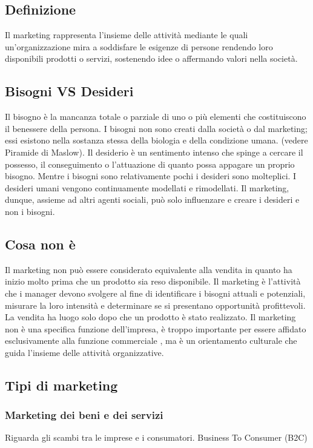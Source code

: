\subsection{Definizione}
Il marketing rappresenta l’insieme delle attività mediante le quali un’organizzazione mira a soddisfare le esigenze di persone rendendo loro disponibili prodotti o servizi, sostenendo idee o affermando valori nella società.

\subsection{Bisogni VS Desideri}
Il bisogno è la mancanza totale o parziale di uno o più elementi che costituiscono il benessere della persona. I bisogni non sono creati dalla società o dal marketing; essi esistono nella sostanza stessa della biologia e della condizione umana. (vedere Piramide di Maslow).
Il desiderio è un sentimento intenso che spinge a cercare il possesso, il conseguimento o l’attuazione di quanto possa appagare un proprio bisogno. \newline
Mentre i bisogni sono relativamente pochi i desideri sono molteplici. I desideri umani vengono continuamente modellati e rimodellati. \newline
Il marketing, dunque, assieme ad altri agenti sociali, può solo influenzare e creare i desideri e non i bisogni.

\subsection{Cosa non è}
Il marketing non può essere considerato equivalente alla vendita in quanto ha inizio molto prima che un prodotto sia reso disponibile. Il marketing è l’attività che i manager devono svolgere al fine di identificare i bisogni attuali e potenziali, misurare la loro intensità e determinare se si presentano opportunità profittevoli. La vendita ha luogo solo dopo che un prodotto è stato realizzato. \newline
Il marketing non è una specifica funzione dell’impresa, è troppo importante per essere affidato esclusivamente alla funzione commerciale , ma è un orientamento culturale che guida l’insieme delle attività organizzative.

\subsection{Tipi di marketing}
\subsubsection*{Marketing dei beni e dei servizi} 
Riguarda gli scambi tra le imprese e i consumatori. Business To Consumer (B2C)
